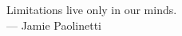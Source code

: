 
\cleardoublepage
{}
\thispagestyle{empty}

\vspace*{3cm}

\begin{center}
Limitations live only in our minds. \\ \medskip
--- Jamie Paolinetti    
\end{center}

\medskip


